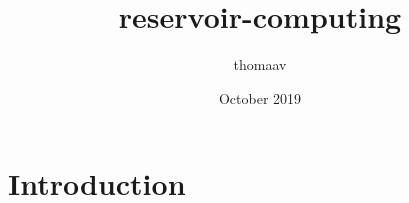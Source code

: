 \documentclass{article}
\title{reservoir-computing}
\author{thomaav }
\date{October 2019}
\begin{document}
\maketitle

\section{Introduction}
\end{document}
